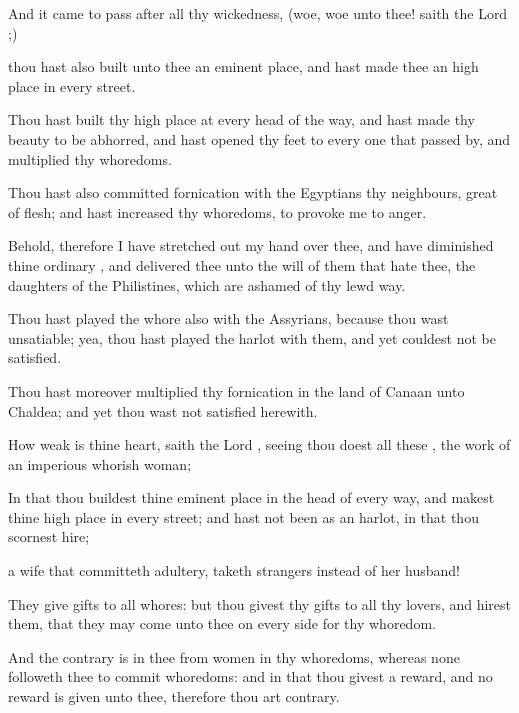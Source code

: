 {And it came to pass
after all thy
wickedness, (woe,
woe unto thee!
saith the
Lord
{};)

 thou hast also
built unto thee an eminent
place, and hast
made thee an high
place in every
street.

Thou hast
built thy high
place at every
head of the
way, and hast made thy
beauty to be
abhorred, and hast
opened thy
feet to every one that passed
by, and
multiplied thy
whoredoms.

Thou hast also committed
fornication with the
Egyptians thy
neighbours,
great of
flesh; and hast
increased thy
whoredoms, to provoke me to
anger.

Behold, therefore I have stretched
out my
hand over thee, and have
diminished thine
ordinary
{}, and
delivered thee unto the
will of them that
hate thee, the
daughters of the
Philistines, which are
ashamed of thy
lewd
way.

Thou hast played the
whore also with the
Assyrians,
because thou wast
unsatiable; yea, thou hast played the
harlot with them, and yet couldest not be
satisfied.

Thou hast moreover
multiplied thy
fornication in the
land of
Canaan unto
Chaldea; and yet thou wast not
satisfied
herewith.

How
weak is thine
heart,
saith the
Lord
{}, seeing thou
doest all these
{}, the
work of an
imperious
whorish
woman;

In that thou
buildest thine eminent
place in the
head of every
way, and
makest thine high
place in every
street; and hast not been as an
harlot, in that thou
scornest
hire;

 a
wife that committeth
adultery,
{}
taketh
strangers instead of her
husband!

They
give
gifts to all
whores: but thou
givest thy
gifts to all thy
lovers, and
hirest them, that they may
come unto thee on every
side for thy
whoredom.

And the
contrary is in thee from
{}
women in thy
whoredoms, whereas none
followeth thee to commit
whoredoms: and in that thou
givest a
reward, and no
reward is
given unto thee, therefore thou
art
contrary.


}
